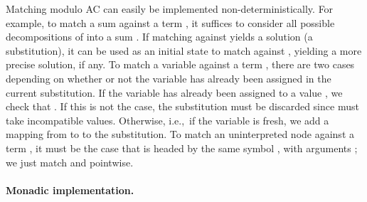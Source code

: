 \documentclass{llncs}
\begin{document}
Matching modulo AC can easily be implemented non-determi\-nistically.
For example, to match a sum  against a term , it suffices
to consider all possible decompositions of  into a sum . If matching  against  yields a solution (a
substitution), it can be used as an initial state to match 
against , yielding a more precise solution, if any.
To match a variable  against a term , there are two cases
depending on whether or not the variable has already been assigned in
the current substitution.  If the variable has already been assigned
to a value , we check that . If this is not the case,
the substitution must be discarded since  must take incompatible
values. Otherwise, i.e.,\ if the variable is fresh, we add a mapping
from  to  to the substitution.
To match an uninterpreted node  against a term ,
it must be the case that  is headed by the same symbol , with
arguments ; we just match  and
 pointwise.

\paragraph{Monadic implementation.}
\end{document}
